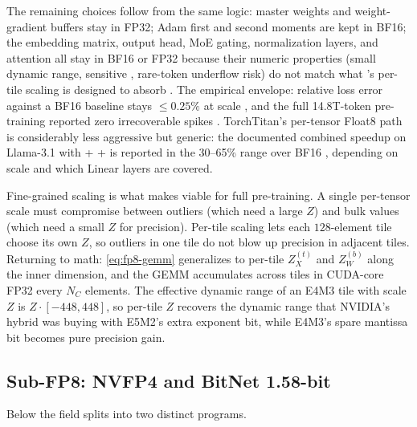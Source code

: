 The remaining  choices follow from the same logic: master
weights and weight-gradient buffers stay in FP32; Adam first and
second moments are kept in BF16; the embedding matrix, output head,
MoE gating, normalization layers, and attention all stay in BF16 or
FP32 because their numeric properties (small dynamic range, sensitive
, rare-token underflow risk) do not match what 's per-tile
scaling is designed to absorb \citep[\S 3.3.1]{deepseek-v3}. The
empirical envelope: relative loss error against a BF16 baseline stays
$\leq 0.25\%$ at scale \citep[\S 3.3]{deepseek-v3}, and the full
14.8T-token pre-training reported zero irrecoverable spikes
\citep[abstract]{deepseek-v3}. TorchTitan's per-tensor Float8 path is
considerably less aggressive but generic: the documented combined
speedup on Llama-3.1 with  +  +  is reported in the
30--65\% range over BF16 \citep[\S 2.2.4]{torchtitan2024}, depending
on scale and which Linear layers are covered.

\begin{intuition}
Fine-grained scaling is what makes  viable for full pre-training.
A single per-tensor scale must compromise between outliers (which need
a large $Z$) and bulk values (which need a small $Z$ for precision).
Per-tile scaling lets each $128$-element tile choose its own $Z$, so
outliers in one tile do not blow up precision in adjacent tiles.
Returning to math: \cref{eq:fp8-gemm} generalizes to per-tile
$Z_X^{(t)}$ and $Z_W^{(b)}$ along the inner dimension, and the GEMM
accumulates across tiles in CUDA-core FP32 every $N_C$ elements. The
effective dynamic range of an E4M3 tile with scale $Z$ is $Z \cdot
[-448, 448]$, so per-tile $Z$ recovers the dynamic range that NVIDIA's
hybrid was buying with E5M2's extra exponent bit, while E4M3's spare
mantissa bit becomes pure precision gain.
\end{intuition}

\subsection{Sub-FP8: NVFP4 and BitNet 1.58-bit}
\label{sec:mp-sub-fp8}

Below  the field splits into two distinct programs.

